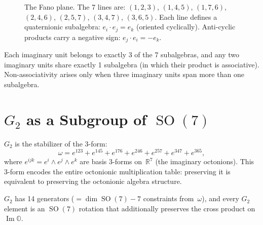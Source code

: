 \documentclass[11pt,a4paper]{article}
\DeclareMathOperator{\SO}{SO}
\DeclareMathOperator{\Ima}{Im}
\newcommand{\Oct}{\mathbb{O}}
\newcommand{\Real}{\mathbb{R}}
\begin{document}
\begin{figure}[ht]
\centering
{}
\caption{The Fano plane. The 7 lines are: $(1,2,3)$, $(1,4,5)$, $(1,7,6)$, $(2,4,6)$, $(2,5,7)$, $(3,4,7)$, $(3,6,5)$. Each line defines a quaternionic subalgebra: $e_i \cdot e_j = e_k$ (oriented cyclically). Anti-cyclic products carry a negative sign: $e_j \cdot e_i = -e_k$.}
\label{fig:fano}
\end{figure}

Each imaginary unit belongs to exactly 3 of the 7 subalgebras, and any two imaginary units share exactly 1 subalgebra (in which their product is associative). Non-associativity arises only when three imaginary units span more than one subalgebra.

\section{\texorpdfstring{$G_2$}{G2} as a Subgroup of \texorpdfstring{$\SO(7)$}{SO(7)}}
\label{app:g2}

$G_2$ is the stabilizer of the 3-form:
\begin{equation}
\omega = e^{123} + e^{145} + e^{176} + e^{246} + e^{257} + e^{347} + e^{365},
\end{equation}
where $e^{ijk} = e^i \wedge e^j \wedge e^k$ are basis 3-forms on~$\Real^7$ (the imaginary octonions). This 3-form encodes the entire octonionic multiplication table: preserving it is equivalent to preserving the octonionic algebra structure.

$G_2$ has 14 generators ($= \dim\SO(7) - 7$ constraints from~$\omega$), and every $G_2$ element is an $\SO(7)$ rotation that additionally preserves the cross product on $\Ima\Oct$.
\end{document}
